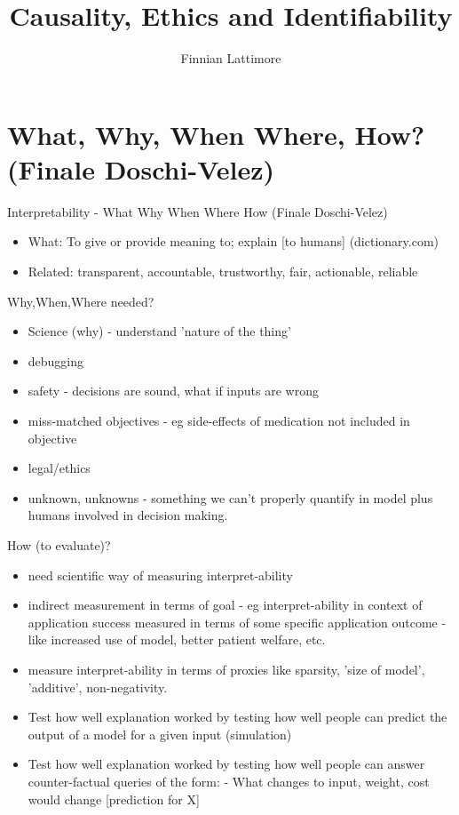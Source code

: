 \documentclass{article}
\title{Causality, Ethics and Identifiability}
\author{Finnian Lattimore}
\theoremstyle{plain}
\theoremstyle{definition}
\begin{document}
\def\ci{\perp\!\!\!\perp}

\maketitle
\section{What, Why, When Where, How? (Finale Doschi-Velez)}
Interpretability - What Why When Where How (Finale Doschi-Velez)
\begin{itemize}
\item What: To give or provide meaning to; explain [to humans] (dictionary.com)
\item Related: transparent, accountable, trustworthy, fair, actionable, reliable
\end{itemize}

Why,When,Where needed?
\begin{itemize}
\item Science (why) - understand 'nature of the thing' 
\item debugging
\item safety - decisions are sound, what if inputs are wrong
\item miss-matched objectives - eg side-effects of medication not included in objective
\item legal/ethics
\item unknown, unknowns - something we can't properly quantify in model plus humans involved in decision making.
\end{itemize}

How (to evaluate)?
\begin{itemize}
\item need scientific way of measuring interpret-ability
\item indirect measurement in terms of goal - eg interpret-ability in context of application success measured in terms of some specific application outcome - like increased use of model, better patient welfare, etc. 
\item measure interpret-ability in terms of proxies like sparsity, 'size of model', 'additive', non-negativity.
\item Test how well explanation worked by testing how well people can predict the output of a model for  a given input (simulation)
\item Test how well explanation worked by testing how well people can answer counter-factual queries of the form:
 - What changes to input, weight, cost would change [prediction for X]    
\end{itemize}
\end{document}
